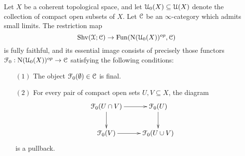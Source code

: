 \begin{theorem}\label{surm}
Let $X$ be a coherent topological space, and let $\operatorname{\mathcal{U}}_0(X) \subseteq \operatorname{\mathcal{U}}(X)$ denote the collection of compact open subsets of $X$. Let $\operatorname{\mathcal{C}}$ be an $\infty$-category which admits small limits.
The restriction map 
$$ \operatorname{Shv}(\operatorname{\mathcal{X}}; \operatorname{\mathcal{C}}) \rightarrow \operatorname{Fun}( \operatorname{N} (\operatorname{\mathcal{U}}_0(X))^{op}, \operatorname{\mathcal{C}})$$
is fully faithful, and its essential image consists of precisely those functors
$\operatorname{\mathcal{F}}_0: \operatorname{N}( \operatorname{\mathcal{U}}_0(X))^{op} \rightarrow \operatorname{\mathcal{C}}$ satisfying the following conditions:
\begin{itemize}
\item[$(1)$] The object $\operatorname{\mathcal{F}}_0(\emptyset) \in \operatorname{\mathcal{C}}$ is final.
\item[$(2)$] For every pair of compact open sets $U, V \subseteq X$, the diagram
$$ \xymatrix{ \calF_0( U \cap V) \ar[r] \ar[d] & \calF_0(U) \ar[d] \\
\calF_0(V) \ar[r] & \calF_0(U \cup V) }$$
is a pullback.
\end{itemize}
\end{theorem}

